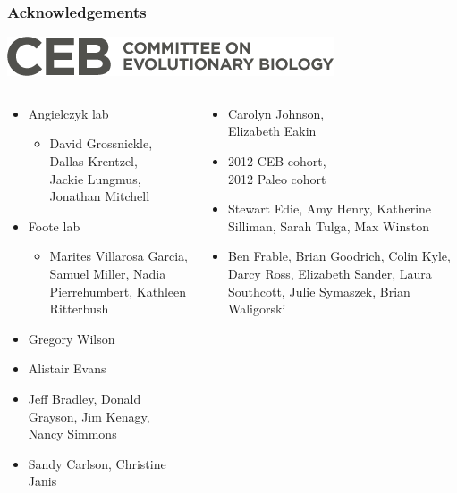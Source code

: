 \documentclass{beamer}
\begin{document}
\begin{frame}
  \frametitle{Acknowledgements}
  \begin{center}
    \includegraphics[width=\textwidth,height=0.1\textheight,keepaspectratio=true]{figure/ceb}
  \end{center}

  \begin{columns}
    \begin{column}{0.35\textwidth}
      \begin{itemize}
        \item \tiny{Angielczyk lab}
          \begin{itemize}
            \item \tiny{David Grossnickle, Dallas Krentzel, \\Jackie Lungmus, Jonathan Mitchell}
          \end{itemize}
        \item \tiny{Foote lab}
          \begin{itemize}
            \item \tiny{Marites Villarosa Garcia, Samuel Miller, Nadia Pierrehumbert, Kathleen Ritterbush}
          \end{itemize}
        \item \tiny{Gregory Wilson}
        \item \tiny{Alistair Evans}
        \item \tiny{Jeff Bradley, Donald Grayson, Jim Kenagy, Nancy Simmons}
        \item \tiny{Sandy Carlson, Christine Janis}
      \end{itemize}
    \end{column}
    \begin{column}{0.35\textwidth}
      \begin{itemize}
        \item \tiny{Carolyn Johnson, \\Elizabeth Eakin}
        \item \tiny{2012 CEB cohort, \\2012 Paleo cohort}
        \item \tiny{\alert{Stewart Edie}, Amy Henry, Katherine Silliman, Sarah Tulga, Max Winston}
        \item \tiny{\alert{Ben Frable}, Brian Goodrich, Colin Kyle, \alert{Darcy Ross}, Elizabeth Sander, Laura Southcott, \alert{Julie Symaszek}, Brian Waligorski}

\end{itemize}
\end{column}
\end{columns}
\end{frame}
\end{document}
